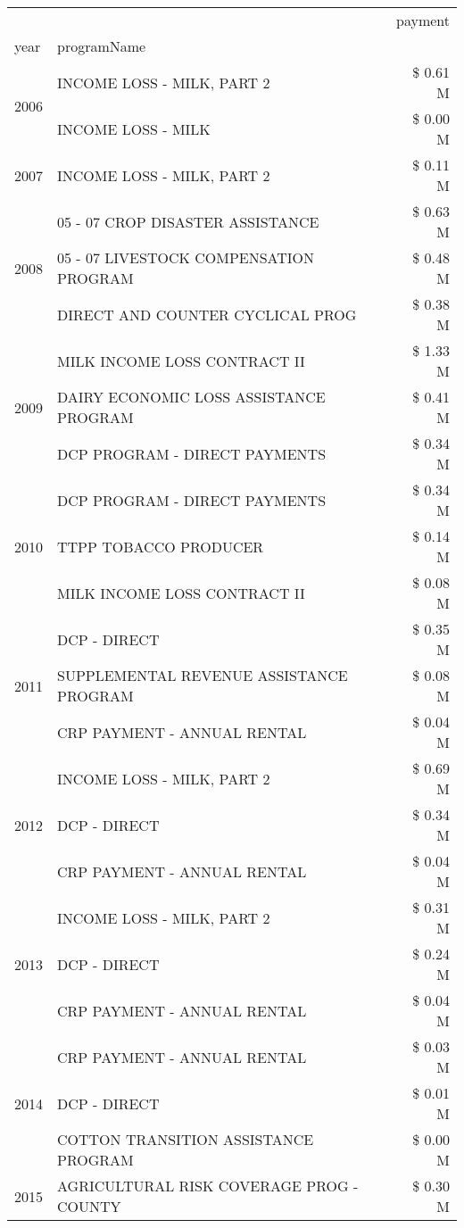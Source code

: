 \begin{tabular}{llr}
\toprule
 &  & payment \\
year & programName &  \\
\midrule
\multirow[t]{2}{*}{2006} & INCOME LOSS - MILK, PART 2 & \$ 0.61 M \\
 & INCOME LOSS - MILK & \$ 0.00 M \\
\cline{1-3}
2007 & INCOME LOSS - MILK, PART 2 & \$ 0.11 M \\
\cline{1-3}
\multirow[t]{3}{*}{2008} & 05 - 07 CROP DISASTER ASSISTANCE & \$ 0.63 M \\
 & 05 - 07 LIVESTOCK COMPENSATION PROGRAM & \$ 0.48 M \\
 & DIRECT AND COUNTER CYCLICAL PROG & \$ 0.38 M \\
\cline{1-3}
\multirow[t]{3}{*}{2009} & MILK INCOME LOSS CONTRACT II & \$ 1.33 M \\
 & DAIRY ECONOMIC LOSS ASSISTANCE PROGRAM & \$ 0.41 M \\
 & DCP PROGRAM - DIRECT PAYMENTS & \$ 0.34 M \\
\cline{1-3}
\multirow[t]{3}{*}{2010} & DCP PROGRAM - DIRECT PAYMENTS & \$ 0.34 M \\
 & TTPP TOBACCO PRODUCER & \$ 0.14 M \\
 & MILK INCOME LOSS CONTRACT II & \$ 0.08 M \\
\cline{1-3}
\multirow[t]{3}{*}{2011} & DCP - DIRECT & \$ 0.35 M \\
 & SUPPLEMENTAL REVENUE ASSISTANCE PROGRAM & \$ 0.08 M \\
 & CRP PAYMENT - ANNUAL RENTAL & \$ 0.04 M \\
\cline{1-3}
\multirow[t]{3}{*}{2012} & INCOME LOSS - MILK, PART 2 & \$ 0.69 M \\
 & DCP - DIRECT & \$ 0.34 M \\
 & CRP PAYMENT - ANNUAL RENTAL & \$ 0.04 M \\
\cline{1-3}
\multirow[t]{3}{*}{2013} & INCOME LOSS - MILK, PART 2 & \$ 0.31 M \\
 & DCP - DIRECT & \$ 0.24 M \\
 & CRP PAYMENT - ANNUAL RENTAL & \$ 0.04 M \\
\cline{1-3}
\multirow[t]{3}{*}{2014} & CRP PAYMENT - ANNUAL RENTAL & \$ 0.03 M \\
 & DCP - DIRECT & \$ 0.01 M \\
 & COTTON TRANSITION ASSISTANCE PROGRAM & \$ 0.00 M \\
\cline{1-3}
\multirow[t]{3}{*}{2015} & AGRICULTURAL RISK COVERAGE PROG - COUNTY & \$ 0.30 M \\

\end{tabular}
